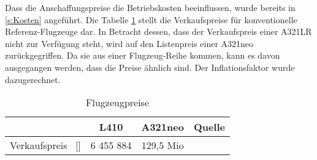 Dass die Anschaffungspreise die Betriebskosten beeinflussen, wurde bereits in \ref{s:Kosten} angeführt. 
Die Tabelle \ref{Flugzeugpreise} stellt die Verkaufspreise für konventionelle Referenz-Flugzeuge dar.
In Betracht dessen, dass der Verkaufspreis einer A321LR nicht zur Verfügung steht, wird auf den Listenpreis einer A321neo zurückgegriffen. 
Da sie aus einer Flugzeug-Reihe kommen, kann es davon ausgegangen werden, dass die Preise ähnlich sind. 
Der Inflationsfaktor wurde dazugerechnet.

\begin{table}[h]
	\begin{center}
    \caption{Flugzeugpreise}
	\label{Flugzeugpreise}
	\begin{tabular}{|l|c|c|c|}
		\hline
		 & \textbf{L410} & \textbf{A321neo}  & \textbf{Quelle}  \\ \hline
		 Verkaufspreis ~[\text{EUR}] & 6 455 884 & 129,5 Mio &  \cite{marksel2023comparative} \cite{aerotelegraph_airbus}\\ \hline
	\end{tabular}
    \end{center}
\end{table}

